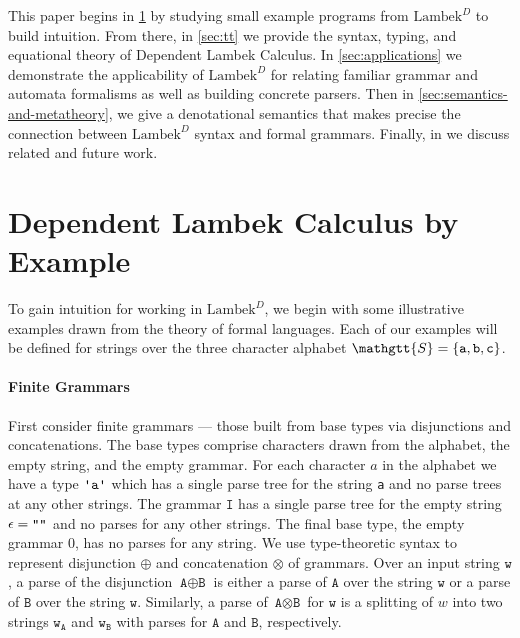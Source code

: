 \documentclass[acmsmall,nonacm]{acmart}
\renewcommand{\Sigma}{\mathgtt{S}}
\newcommand{\theoryname}{Dependent Lambek Calculus\xspace}
\newcommand{\theoryabbv}{$\textrm{Lambek}^D$\xspace}
\newcommand{\literal}[1]{\texttt{\textquotesingle#1\textquotesingle}}
\newcommand{\stringquote}[1]{\texttt{\textquotedbl#1\textquotedbl}}
\begin{document}
This paper begins in \cref{sec:type-theory-examples} by studying small
example programs from \theoryabbv to build intuition.  From there, in
\cref{sec:tt} we provide the syntax, typing, and equational theory of
\theoryname. In \cref{sec:applications} we demonstrate the
applicability of \theoryabbv for relating familiar grammar and
automata formalisms as well as building concrete parsers.  Then in
\cref{sec:semantics-and-metatheory}, we give a denotational semantics
that makes precise the connection between \theoryabbv syntax and
formal grammars. Finally, in  we discuss related
and future work.

\ifarxiv{}\fi

\section{\theoryname by Example}
\label{sec:type-theory-examples}
To gain intuition for working in \theoryabbv, we begin with some
illustrative examples drawn from the theory of formal languages. Each
of our examples will be defined for strings over the three character
alphabet $\Sigma = \{ \texttt{a} , \texttt{b}, \texttt{c} \}$.

\newcommand{\A}{\texttt{A}}
\newcommand{\B}{\texttt{B}}
\newcommand{\I}{\texttt{I}}
\newcommand{\f}{\texttt{f}}
\newcommand{\g}{\texttt{g}}
\renewcommand{\L}{\texttt{L}}
\renewcommand{\a}{\texttt{a}}
\renewcommand{\b}{\texttt{b}}
\renewcommand{\c}{\texttt{c}}
\newcommand{\w}{\texttt{w}}

\paragraph{Finite Grammars}
First consider finite grammars --- those built from base types via disjunctions and
concatenations. The base types comprise characters drawn from the alphabet, the
empty string, and the empty grammar.
For each character $a$ in the alphabet we have a type $\literal a$ which
has a single parse tree for the string
\stringquote{a} and no parse trees at any other strings. The grammar $\I$ has a single
parse tree for the empty string $\epsilon = \stringquote{}$ and no parses for any other strings.
The final base type, the empty grammar $0$, has no parses for any string. We
use type-theoretic syntax to represent disjunction $\oplus$ and concatenation
$\otimes$ of
grammars. Over an input string $\w$, a parse of the disjunction $\A \oplus \B$ is either
a parse of $\A$ over the string $\w$ or a
parse of $\B$ over the string $\w$. Similarly, a parse of $\A \otimes \B$ for
$\w$ is a splitting of $w$ into two strings $\w_{\A}$ and $\w_{\B}$ with
parses for $\A$
and $\B$, respectively.
\end{document}
